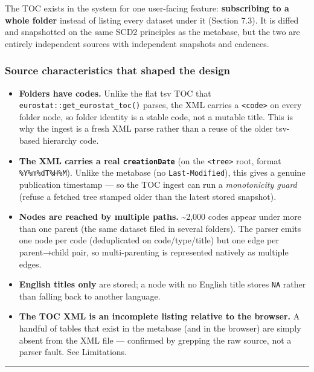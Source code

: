 \documentclass[
]{article}
\providecommand{\tightlist}{%
  \setlength{\itemsep}{0pt}\setlength{\parskip}{0pt}}
\begin{document}
The TOC exists in the system for one user-facing feature:
\textbf{subscribing to a whole folder} instead of listing every dataset
under it (Section 7.3). It is diffed and snapshotted on the same SCD2
principles as the metabase, but the two are entirely independent sources
with independent snapshots and cadences.

\subsubsection{Source characteristics that shaped the
design}\label{source-characteristics-that-shaped-the-design}

\begin{itemize}
\tightlist
\item
  \textbf{Folders have codes.} Unlike the flat tsv TOC that
  \texttt{eurostat::get\_eurostat\_toc()} parses, the XML carries a
  \texttt{\textless{}code\textgreater{}} on every folder node, so folder
  identity is a stable code, not a mutable title. This is why the ingest
  is a fresh XML parse rather than a reuse of the older tsv-based
  hierarchy code.
\item
  \textbf{The XML carries a real \texttt{creationDate}} (on the
  \texttt{\textless{}tree\textgreater{}} root, format
  \texttt{\%Y\%m\%dT\%H\%M}). Unlike the metabase (no
  \texttt{Last-Modified}), this gives a genuine publication timestamp
  --- so the TOC ingest can run a \emph{monotonicity guard} (refuse a
  fetched tree stamped older than the latest stored snapshot).
\item
  \textbf{Nodes are reached by multiple paths.} \textasciitilde2,000
  codes appear under more than one parent (the same dataset filed in
  several folders). The parser emits one node per code (deduplicated on
  code/type/title) but one edge per parent→child pair, so
  multi-parenting is represented natively as multiple edges.
\item
  \textbf{English titles only} are stored; a node with no English title
  stores \texttt{NA} rather than falling back to another language.
\item
  \textbf{The TOC XML is an incomplete listing relative to the browser.}
  A handful of tables that exist in the metabase (and in the browser)
  are simply absent from the XML file --- confirmed by grepping the raw
  source, not a parser fault. See Limitations.
\end{itemize}

\begin{center}\rule{0.5\linewidth}{0.5pt}\end{center}
\end{document}
